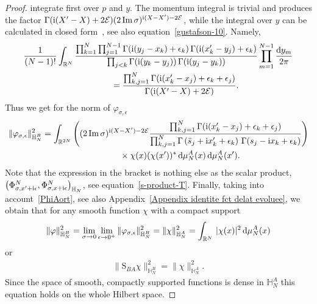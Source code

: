 \begin{proof}
integrate first over $p$ and $y$. The momentum integral is trivial and produces the factor $\Gamma({\rm i}(X'-X)+2\mathcal E) (2
\mathop{\rm Im}\sigma)^{{\rm i}(X-X')-2\mathcal E}$, while the integral over $y$ can be calculated in
 closed form~\cite[Theorem 5.1]{MR1139492}, see also equation~\eqref{gustafson-10}. Namely,
\begin{gather}
\frac1{(N-1)!}\int_{\mathbb R^N}\frac{\prod_{k=1}^N\prod_{j=1}^{N-1} \Gamma({\rm i}(y_j-x_k)+\epsilon_k)\,\Gamma({\rm i}(x'_k-y_j)+\epsilon_k)}
{\prod_{j < k}\Gamma({\rm i}(y_k-y_j))\,\Gamma({\rm i}(y_j-y_k))}
\prod_{m=1}^{N-1} \frac{{\rm d}y_m}{2\pi}\nonumber
\\ \hphantom{\frac1{(N-1)!}}
{}=\frac{\prod_{k,j=1}^{N} \Gamma({\rm i}(x'_k-x_j)+\epsilon_k+\epsilon_j)}{\Gamma({\rm i}(X'-X)+2\mathcal E)}.\label{Gustafson-1}
\end{gather}
Thus we get for the norm of $\varphi_{\sigma,\epsilon}$
\begin{gather}
\|\varphi_{\sigma,\epsilon}\|^2_{\mathbb H_N^B} =\int_{\mathbb R^{2N}}
\left((2\mathop{\rm Im}\sigma)^{{\rm i}(X-X')-2\mathcal E}\frac{\prod_{k,j=1}^{N} \Gamma({\rm i}(x'_k-x_j)+\epsilon_k+\epsilon_j)}{\prod_{k,j=1}^{N}
\Gamma\left(\bar s_j+{\rm i}x'_k+\epsilon_k\right)\,\Gamma( s_j-{\rm i}x_k+\epsilon_k)}\right)\notag
\\ \hphantom{\|\varphi_{\sigma,\epsilon}\|^2_{\mathbb H_N^B} =}
{}\times \chi(x)(\chi(x'))^* \,{\rm d}\mu_N^A(x)\,{\rm d}\mu_N^A(x').\label{varphi_norm_final}
\end{gather}
Note that the expression in the bracket is nothing else as the scalar product,
$\big(\Phi^N_{\sigma,x'+{\rm i}\epsilon},\Phi^N_{\sigma,x+{\rm i}\epsilon}\big)_{ \mathbb H_N }$, see equation~\eqref{s-product-T}. Finally, taking into account~\eqref{PhiAort}, see also Appendix~\ref{Appendix identite fct delat evoluee}, we obtain that for any smooth function $\chi$ with a
compact support
\begin{gather*}
\|\varphi\|^2_{\mathbb H_N^B}=\lim_{\sigma\to 0}\lim_{\epsilon\to 0^+}\|\varphi_{\sigma,\epsilon}\|^2_{ \mathbb H_N^B }
=\|\chi\|^2_{\mathbb H_N^A} =\int_{\mathbb R^{N}}\, |\chi( x)|^2\,{\rm d}\mu_{N}^A(x)
\end{gather*}
or
\begin{gather*}
\|\mathrm S_{BA}\chi\|^2_{\mathbb H_N^B}=\|\chi\|^2_{\mathbb H_N^A}.
\end{gather*}
Since the space of smooth, compactly supported functions is dense in $\mathbb H_N^A$ this equation holds on the whole Hilbert space.
\end{proof}


